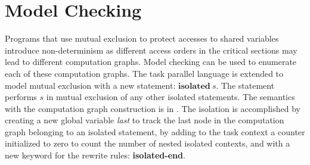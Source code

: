 \section{Model Checking}

Programs that use mutual exclusion to protect accesses to shared variables introduce non-determinism as different access orders in the critical sections may lead to different computation graphs. Model checking can be used to enumerate each of these computation graphs. The task parallel language is extended to model mutual exclusion with a new statement: $\textbf{isolated}~s$.
The statement performs $s$ in mutual exclusion of any other isolated statements. The semantics with the computation graph construction is in . The isolation is accomplished by creating a new global variable \textit{last} to track the last node in the computation graph belonging to an isolated statement, by adding to the task context a counter initialized to zero to count the number of nested isolated contexts, and with a new keyword for the rewrite rules: \textbf{isolated-end}. 

